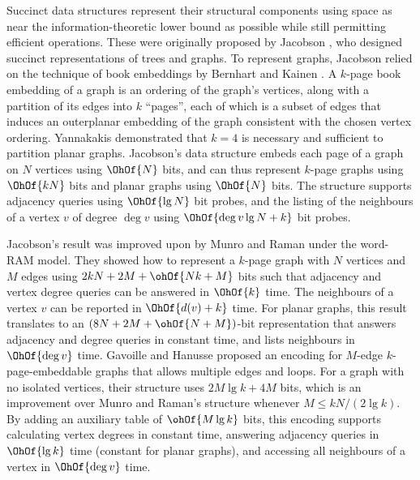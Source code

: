 Succinct data structures represent their structural
components using space as near the information-theoretic lower bound as
possible while still permitting efficient operations.
These were originally proposed by Jacobson
\cite{jac_1989}, who designed succinct representations of trees and
graphs.
To represent graphs, Jacobson relied on the technique of book
embeddings by Bernhart and Kainen
\cite{DBLP:journals/jct/BernhartK79}.
A $k$-page book embedding of a graph is an ordering of the graph's vertices,
along with a partition of its edges into $k$ ``pages'',
each of which is a subset of edges that induces an outerplanar embedding of
the graph consistent with the chosen vertex ordering.
Yannakakis \cite{DBLP:conf/stoc/Yannakakis86}
demonstrated that $k=4$ is necessary and sufficient to partition
planar graphs.
Jacobson's data structure embeds each page of a graph
on $N$ vertices using $\OhOf{N}$ bits, and can thus represent
$k$-page graphs using $\OhOf{kN}$ bits and planar graphs using
$\OhOf{N}$ bits.
The structure supports adjacency queries using
$\OhOf{\lg N}$ bit probes, and the listing of the neighbours of a
vertex $v$ of degree $\deg{v}$ using $\OhOf{\deg{v} \lg N + k}$ bit
probes.

Jacobson's result was improved upon by Munro and Raman
\cite{DBLP:conf/focs/MunroR97} under the word-RAM model.
They showed how to represent a $k$-page graph with $N$ vertices and $M$ edges
using $2kN + 2M + \ohOf{Nk + M}$ bits such that adjacency and
vertex degree queries can be answered in $\OhOf{k}$ time.
The neighbours of a vertex $v$ can be reported in $\OhOf{d(v)+k}$ time.
For planar graphs, this result translates to an $(8N + 2M + \ohOf{N+M})$-bit
representation that answers adjacency and degree queries in constant
time, and lists neighbours in $\OhOf{\deg{v}}$ time.
Gavoille and Hanusse \cite{DBLP:journals/dmtcs/GavoilleH08} proposed an encoding
for $M$-edge $k$-page-embeddable graphs that allows multiple edges and
loops.
For a graph with no isolated vertices, their structure uses $2M
\lg k + 4M$ bits, which is an improvement over Munro and Raman's
structure whenever $M \le kN / (2\lg k)$.
By adding an auxiliary table of $\ohOf{M \lg k}$ bits, this encoding
supports calculating vertex degrees in constant time, answering adjacency
queries in $\OhOf{\lg k}$ time (constant for planar graphs), and
accessing all neighbours of a vertex in $\OhOf{\deg{v}}$ time.

